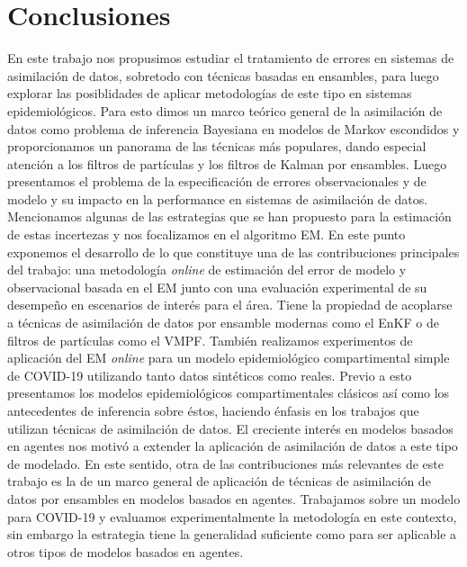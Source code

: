 \chapter{Conclusiones} \label{chp:conclusion}

En este trabajo nos propusimos estudiar el tratamiento de errores en sistemas de asimilación de datos, sobretodo con técnicas basadas en ensambles, para luego explorar las posiblidades de aplicar metodologías de este tipo en sistemas epidemiológicos. Para esto dimos un marco teórico general de la asimilación de datos como problema de inferencia Bayesiana en modelos de Markov escondidos y proporcionamos un panorama de las técnicas más populares, dando especial atención a los filtros de partículas y los filtros de Kalman por ensambles. Luego presentamos el problema de la especificación de errores observacionales y de modelo y su impacto en la performance en sistemas de asimilación de datos. Mencionamos algunas de las estrategias que se han propuesto para la estimación de estas incertezas y nos focalizamos en el algoritmo EM. En este punto exponemos el desarrollo de lo que constituye una de las contribuciones principales del trabajo: una metodología \textit{online} de estimación del error de modelo y observacional basada en el EM junto con una evaluación experimental de su desempeño en escenarios de interés para el área. Tiene la propiedad de acoplarse a técnicas de asimilación de datos por ensamble modernas como el EnKF o de filtros de partículas como el VMPF. También realizamos experimentos de aplicación del EM \textit{online} para un modelo epidemiológico compartimental simple de COVID-19 utilizando tanto datos sintéticos como reales. Previo a esto presentamos los modelos epidemiológicos compartimentales clásicos así como los antecedentes de inferencia sobre éstos, haciendo énfasis en los trabajos que utilizan técnicas de asimilación de datos. El creciente interés en modelos basados en agentes nos motivó a extender la aplicación de asimilación de datos a este tipo de modelado. En este sentido, otra de las contribuciones más relevantes de este trabajo es la de un marco general de aplicación de técnicas de asimilación de datos por ensambles en modelos basados en agentes. Trabajamos sobre un modelo para COVID-19 y evaluamos experimentalmente la metodología en este contexto, sin embargo la estrategia tiene la generalidad suficiente como para ser aplicable a otros tipos de modelos basados en agentes.

